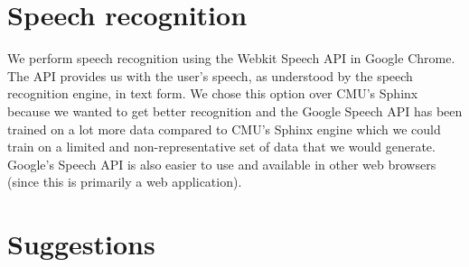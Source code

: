 \documentclass[]{article}
\begin{document}
\section{Speech recognition}

We perform speech recognition using the Webkit Speech API in Google Chrome. The API provides us with the user's speech, as understood by the speech recognition engine, in text form. We chose this option over CMU's Sphinx because we wanted to get better recognition and the Google Speech API has been trained on a lot more data compared to CMU's Sphinx engine which we could train on a limited and non-representative set of data that we would generate. Google's Speech API is also easier to use and available in other web browsers (since this is primarily a web application).

\section{Suggestions}

\end{document}
